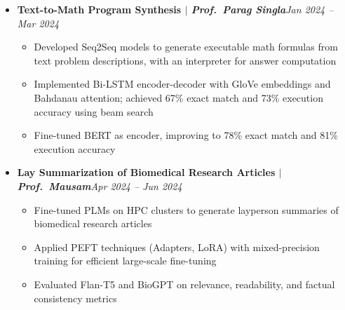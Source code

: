 \documentclass[10pt,letterpaper]{article}
\newcommand{\dates}[1]{\hfill{\color{dateblue}\itshape #1}}
\newcommand{\proj}[3]{\textbf{#1 $|$ \textit{#2}}\dates{#3}}
\begin{document}
\begin{itemize}
  \begin{itemize}
    \item Designed a model to identify answer cells in custom tables for complex natural language queries
    \item Built a two-stage transformer architecture: column predictor followed by row predictor conditioned on query and predicted columns
    \item Prompt-tuned Gemma, improving exact match accuracy from 43\% (two-model pipeline) to 67\%
  \end{itemize}
  \item \proj{Text-to-Math Program Synthesis}{Prof.\ Parag Singla}{Jan 2024 -- Mar 2024}
  \begin{itemize}
    \item Developed Seq2Seq models to generate executable math formulas from text problem descriptions, with an interpreter for answer computation
    \item Implemented Bi-LSTM encoder-decoder with GloVe embeddings and Bahdanau attention; achieved 67\% exact match and 73\% execution accuracy using beam search
    \item Fine-tuned BERT as encoder, improving to 78\% exact match and 81\% execution accuracy
  \end{itemize}
  \item \proj{Lay Summarization of Biomedical Research Articles}{Prof.\ Mausam}{Apr 2024 -- Jun 2024}
  \begin{itemize}
    \item Fine-tuned PLMs on HPC clusters to generate layperson summaries of biomedical research articles
    \item Applied PEFT techniques (Adapters, LoRA) with mixed-precision training for efficient large-scale fine-tuning
    \item Evaluated Flan-T5 and BioGPT on relevance, readability, and factual consistency metrics
  \end{itemize}
\end{itemize}
\end{document}
